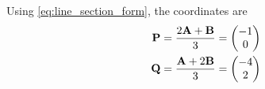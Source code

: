 
Using \eqref{eq:line_section_form}, the coordinates are
%
\begin{align}
\label{eq:line_section_form_tri}
\mathbf{P} &= \frac{2 \mathbf{A} + \mathbf{B}}{3}= \begin{pmatrix}-1 \\ 0\end{pmatrix}
\\
\mathbf{Q} &= \frac{ \mathbf{A} + 2\mathbf{B}}{3}= \begin{pmatrix}-4 \\ 2\end{pmatrix}
\end{align}
